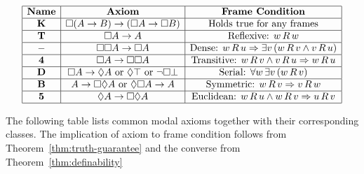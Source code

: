 \begin{table}[h]
  \centering
  \[
  \begin{array}{|c|c|c|}
  \hline
  \textbf{Name} & \textbf{Axiom} & \textbf{Frame Condition} \\
  \hline
  \textbf{K} & \Box (A \to B) \to (\Box A \to \Box B) 
            & \text{Holds true for any frames} \\
  \hline
  \textbf{T} & \Box A \to A 
            & \text{Reflexive: } w\,R\,w \\
  \hline
  - & \Box\Box A \to \Box A 
    & \text{Dense: } w\,R\,u \Rightarrow \exists v\,(w\,R\,v \land v\,R\,u) \\
  \hline
  \textbf{4} & \Box A \to \Box\Box A 
            & \text{Transitive: } w\,R\,v \wedge v\,R\,u \Rightarrow w\,R\,u \\
  \hline
  \textbf{D} & \Box A \to \Diamond A \text{ or } \Diamond\top \text{ or } \neg\Box\bot 
            & \text{Serial: } \forall w\,\exists v\,(w\,R\,v) \\
  \hline
  \textbf{B} & A \to \Box\Diamond A \text{ or } \Diamond\Box A \to A 
            & \text{Symmetric: } w\,R\,v \Rightarrow v\,R\,w \\
  \hline
  \textbf{5} & \Diamond A \to \Box\Diamond  A
            & \text{Euclidean: } w\,R\,u \land w\,R\,v \Rightarrow u\,R\,v \\
  \hline
  \end{array}
  \]
  \caption{The following table lists common modal axioms together with their corresponding classes. 
  The implication of axiom to frame condition follows from Theorem~\ref{thm:truth-guarantee} and the converse from Theorem~\ref{thm:definability}}
  \label{tab:table-schemata-relations}
\end{table}



